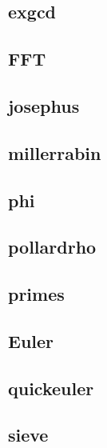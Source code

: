 \documentclass[a4paper,10pt,twocolumn,oneside]{article}
\begin{document}
    \subsection{exgcd}
    

    \subsection{FFT}
    

    \subsection{josephus}
    

    \vspace{1.2em}
    \vspace{1.2em}
    \subsection{millerrabin}
    

    \subsection{phi}
    

    \subsection{pollardrho}
    

    \subsection{primes}
    

    \subsection{Euler}
    

    \subsection{quickeuler}
    

    \subsection{sieve}
    
\end{document}
